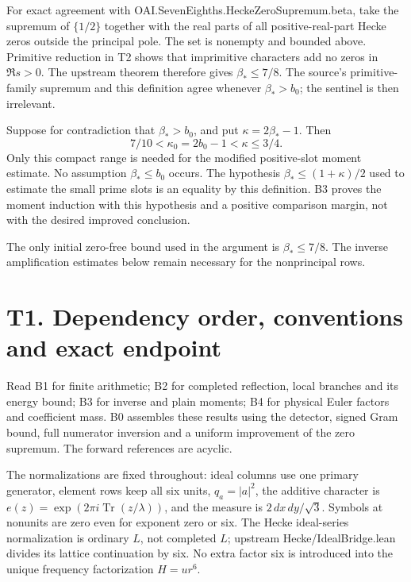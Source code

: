 \documentclass[11pt,a4paper]{article}
\newcommand{\sourcecode}[1]{{\small\ttfamily #1}}
\begin{document}
For exact agreement with
\sourcecode{OAI.\allowbreak{}Seven\allowbreak{}Eighths.\allowbreak{}Hecke\allowbreak{}Zero\allowbreak{}Supremum.\allowbreak{}beta}, take the supremum of
\(\{1/2\}\) together with the real parts of all positive-real-part Hecke
zeros outside the principal pole. The set is nonempty and bounded above.
Primitive reduction in T2 shows that imprimitive characters add no zeros
in \(\Re s>0\). The upstream theorem therefore gives \(\beta_*\le7/8\).
The source's primitive-family supremum and this definition agree
whenever \(\beta_*>b_0\); the sentinel is then irrelevant.

Suppose for contradiction that \(\beta_*>b_0\), and put
\(\kappa=2\beta_*-1\). Then \[
7/10<\kappa_0=2b_0-1<\kappa\le3/4.
\] Only this compact range is needed for the modified positive-slot
moment estimate. No assumption \(\beta_*\le b_0\) occurs. The hypothesis
\(\beta_*\le(1+\kappa)/2\) used to estimate the small prime slots is an
equality by this definition. B3 proves the moment induction with this
hypothesis and a positive comparison margin, not with the desired
improved conclusion.

The only initial zero-free bound used in the argument is
\(\beta_*\le7/8\). The inverse amplification estimates below remain
necessary for the nonprincipal rows.

\hypertarget{t1.-dependency-order-conventions-and-exact-endpoint}{%
\section{T1. Dependency order, conventions and exact
endpoint}\label{t1.-dependency-order-conventions-and-exact-endpoint}}

Read B1 for finite arithmetic; B2 for completed reflection, local
branches and its energy bound; B3 for inverse and plain moments; B4 for
physical Euler factors and coefficient mass. B0 assembles these results
using the detector, signed Gram bound, full numerator inversion and a
uniform improvement of the zero supremum. The forward references are
acyclic.

The normalizations are fixed throughout: ideal columns use one primary
generator, element rows keep all six units, \(q_a=|a|^2\), the additive
character is \(e(z)=\exp(2\pi i\operatorname{Tr}(z/\lambda))\), and the
measure is \(2\,\allowbreak{}dx\,\allowbreak{}dy/\sqrt3\). Symbols at nonunits are zero even for
exponent zero or six. The Hecke ideal-series normalization is ordinary
\(L\), not completed \(L\); upstream \sourcecode{Hecke/\allowbreak{}Ideal\allowbreak{}Bridge.\allowbreak{}lean}
divides its lattice continuation by six. No extra factor six is
introduced into the unique frequency factorization \(H=ur^6\).
\end{document}
